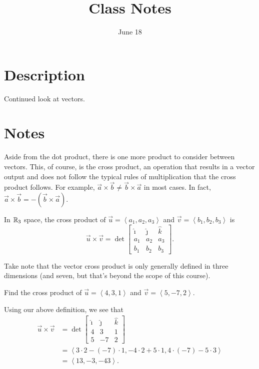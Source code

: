 \documentclass[12pt]{scrartcl}
\title{Class Notes}
\date{June 18}
\begin{document}
\maketitle

\pagebreak

\section{Description}

Continued look at vectors.

\section{Notes}

Aside from the dot product, there is one more product to consider between vectors. This, of course, is the cross product, an operation that results in a vector output and does not follow the typical rules of multiplication that the cross product follows. For example, $\vec{a} \times \vec{b} \neq \vec{b} \times \vec{a}$ in most cases. In fact, $\vec{a} \times \vec{b} = -(\vec{b} \times \vec{a})$.

\begin{definition}
    In $\mathbb R_{3}$ space, the cross product of $\vec{u} = \left<a_{1}, a_{2}, a_{3}\right>$ and $\vec{v} = \left<b_{1}, b_{2}, b_{3}\right>$ is
    \[\vec{u} \times \vec{v} = \det \begin{bmatrix} \hat{\imath} & \hat{\jmath} & \hat{k} \\ a_{1} & a_{2} & a_{3} \\ b_{1} & b_{2} & b_{3} \end{bmatrix}.\]
\end{definition}

\begin{remark}
    Take note that the vector cross product is only generally defined in three dimensions (and seven, but that's beyond the scope of this course).
\end{remark}

\begin{example}
    Find the cross product of $\vec{u} = \left<4, 3, 1\right>$ and $\vec{v} = \left<5, -7, 2\right>$.

    \begin{soln}
        Using our above definition, we see that
        \begin{align*}
            \vec{u} \times \vec{v} &= \det \begin{bmatrix}
                \hat{\imath} & \hat{\jmath} & \hat{k} \\
                4 & 3 & 1 \\
                5 & -7 & 2
            \end{bmatrix} \\
            &= \left<3 \cdot 2 - (-7) \cdot 1, -4 \cdot 2 + 5 \cdot 1, 4 \cdot (-7) - 5 \cdot 3\right> \\
            &= \left<13, -3, -43\right>.
        \end{align*}
    \end{soln}
\end{example}
\end{document}
